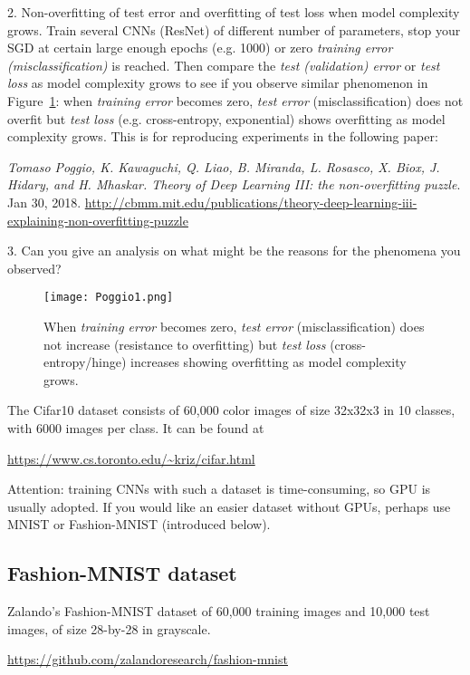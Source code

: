 \documentclass[11pt]{article}
\begin{document}
2. Non-overfitting of test error and overfitting of test loss when model complexity grows. Train several CNNs (ResNet) of different number of parameters, stop your SGD at certain large enough epochs (e.g. 1000) or zero \emph{training error (misclassification)} is reached. Then compare the \emph{test (validation) error} or \emph{test loss} as model complexity grows to see if you observe similar phenomenon in Figure~\ref{fig:Poggio1}: when \emph{training error} becomes zero, \emph{test error} (misclassification) does not overfit but \emph{test loss} (e.g. cross-entropy, exponential) shows overfitting as model complexity grows. This is for reproducing experiments in the following paper: 

\emph{Tomaso Poggio, K. Kawaguchi, Q. Liao, B. Miranda, L. Rosasco, X. Biox, J. Hidary, and H. Mhaskar. Theory of Deep Learning III: the non-overfitting puzzle}. Jan 30, 2018. \url{http://cbmm.mit.edu/publications/theory-deep-learning-iii-explaining-non-overfitting-puzzle} 

3. Can you give an analysis on what might be the reasons for the phenomena you observed? 

\begin{figure}
\center
\texttt{[image: Poggio1.png]}  
\caption{When \emph{training error} becomes zero, \emph{test error} (misclassification) does not increase (resistance to overfitting) but \emph{test loss} (cross-entropy/hinge) increases showing overfitting as model complexity grows.}
\label{fig:Poggio1}
\end{figure}

The Cifar10 dataset consists of 60,000 color images of size 32x32x3 in 10 classes, with 6000 images per class. It can be found at 

\url{https://www.cs.toronto.edu/~kriz/cifar.html}

\noindent Attention: training CNNs with such a dataset is time-consuming, so GPU is usually adopted. If you would like an easier dataset without GPUs, perhaps use MNIST or Fashion-MNIST (introduced below).

\subsection{Fashion-MNIST dataset}

Zalando's Fashion-MNIST dataset of 60,000 training images and 10,000 test images, of size 28-by-28 in grayscale. 

\url{https://github.com/zalandoresearch/fashion-mnist}
\end{document}
